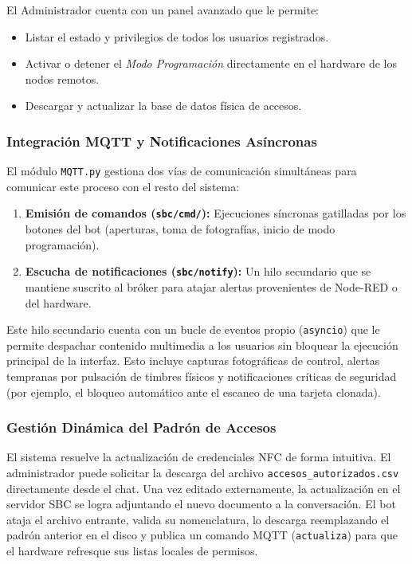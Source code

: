 El Administrador cuenta con un panel avanzado que le permite:
\begin{itemize}
    \item Listar el estado y privilegios de todos los usuarios registrados.
    \item Activar o detener el \textit{Modo Programación} directamente en el hardware de los nodos remotos.
    \item Descargar y actualizar la base de datos física de accesos.
\end{itemize}

\subsubsection{Integración MQTT y Notificaciones Asíncronas}
El módulo \texttt{MQTT.py} gestiona dos vías de comunicación simultáneas para comunicar este proceso con el resto del sistema:
\begin{enumerate}
    \item \textbf{Emisión de comandos (\texttt{sbc/cmd/}):} Ejecuciones síncronas gatilladas por los botones del bot (aperturas, toma de fotografías, inicio de modo programación).
    \item \textbf{Escucha de notificaciones (\texttt{sbc/notify}):} Un hilo secundario que se mantiene suscrito al bróker para atajar alertas provenientes de Node-RED o del hardware.
\end{enumerate}

Este hilo secundario cuenta con un bucle de eventos propio (\texttt{asyncio}) que le permite despachar contenido multimedia a los usuarios sin bloquear la ejecución principal de la interfaz. Esto incluye capturas fotográficas de control, alertas tempranas por pulsación de timbres físicos y notificaciones críticas de seguridad (por ejemplo, el bloqueo automático ante el escaneo de una tarjeta clonada).

\subsubsection{Gestión Dinámica del Padrón de Accesos}
El sistema resuelve la actualización de credenciales NFC de forma intuitiva. El administrador puede solicitar la descarga del archivo \texttt{accesos\_autorizados.csv} directamente desde el chat. Una vez editado externamente, la actualización en el servidor SBC se logra adjuntando el nuevo documento a la conversación. El bot ataja el archivo entrante, valida su nomenclatura, lo descarga reemplazando el padrón anterior en el disco y publica un comando MQTT (\texttt{actualiza}) para que el hardware refresque sus listas locales de permisos.



